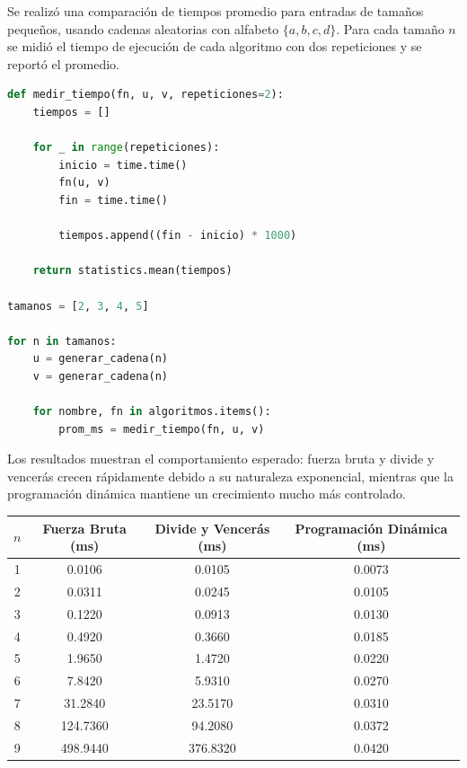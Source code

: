 \documentclass[12pt]{article}
\begin{document}
Se realizó una comparación de tiempos promedio para entradas de tamaños pequeños, usando cadenas aleatorias con alfabeto \(\{a,b,c,d\}\). Para cada tamaño \(n\) se midió el tiempo de ejecución de cada algoritmo con dos repeticiones y se reportó el promedio.

\begin{lstlisting}[language=Python]
def medir_tiempo(fn, u, v, repeticiones=2):
    tiempos = []

    for _ in range(repeticiones):
        inicio = time.time()
        fn(u, v)
        fin = time.time()

        tiempos.append((fin - inicio) * 1000)

    return statistics.mean(tiempos)

tamanos = [2, 3, 4, 5]

for n in tamanos:
    u = generar_cadena(n)
    v = generar_cadena(n)

    for nombre, fn in algoritmos.items():
        prom_ms = medir_tiempo(fn, u, v)
\end{lstlisting}


Los resultados muestran el comportamiento esperado: fuerza bruta y divide y vencerás crecen rápidamente debido a su naturaleza exponencial, mientras que la programación dinámica mantiene un crecimiento mucho más controlado.

\begin{center}
    \begin{tabular}{|c|c|c|c|}
        \hline
        $n$ & Fuerza Bruta (ms) & Divide y Vencerás (ms) & Programación Dinámica (ms) \\
        \hline
        1 & 0.0106 & 0.0105 & 0.0073 \\
        \hline
        2 & 0.0311 & 0.0245 & 0.0105 \\
        \hline
        3 & 0.1220 & 0.0913 & 0.0130 \\
        \hline
        4 & 0.4920 & 0.3660 & 0.0185 \\
        \hline
        5 & 1.9650 & 1.4720 & 0.0220 \\
        \hline
        6 & 7.8420 & 5.9310 & 0.0270 \\
        \hline
        7 & 31.2840 & 23.5170 & 0.0310 \\
        \hline
        8 & 124.7360 & 94.2080 & 0.0372 \\
        \hline
        9 & 498.9440 & 376.8320 & 0.0420 \\
        \hline
    \end{tabular}
\end{center}
\end{document}
